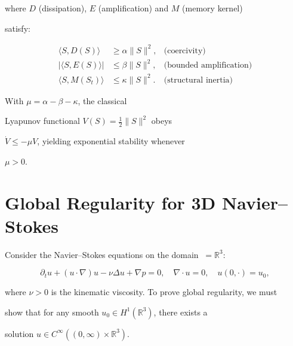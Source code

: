 ﻿\documentclass[11pt,a4paper]{amsart}
\newcommand{\alphacoeff}{\ensuremath{\alpha}}
\newcommand{\betacoeff}{\ensuremath{\beta}}
\newcommand{\kappacoeff}{\ensuremath{\kappa}}
\newcommand{\mumargin}{\ensuremath{\mu}}
\begin{document}
where $D$ (dissipation), $E$ (amplification) and $M$ (memory kernel)

satisfy:

\begin{align}

 \langle S,D(S)\rangle &\ge \alphacoeff\|S\|^{2},

 &\text{(coercivity)}\\

 |\langle S,E(S)\rangle| &\le \betacoeff\|S\|^{2},

 &\text{(bounded amplification)}\\

 \langle S,M(S_t)\rangle &\le \kappacoeff\|S\|^{2}.

 &\text{(structural inertia)}

\end{align}

With $\mumargin=\alphacoeff-\betacoeff-\kappacoeff$, the classical

Lyapunov functional $V(S)=\tfrac12\|S\|^{2}$ obeys

$\dot V\le -\mumargin V$, yielding exponential stability whenever

$\mumargin>0$.




\section{Global Regularity for 3D Navier--Stokes}

Consider the Navier--Stokes equations on the domain $\ = \mathbb{R}^3$:

\begin{equation}

 \partial_t u + (u \cdot \nabla) u - \nu \Delta u + \nabla p = 0,

 \quad \nabla \cdot u = 0,

 \quad u(0, \cdot) = u_0,

\end{equation}

where $\nu > 0$ is the kinematic viscosity. To prove global regularity, we must

show that for any smooth $u_0 \in H^1(\mathbb{R}^3)$, there exists a

solution $u \in C^{\infty}((0, \infty) \times \mathbb{R}^3)$.
\end{document}
